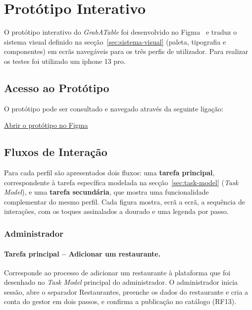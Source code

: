 \chapter{Protótipo Interativo}

O protótipo interativo do \textit{GrabATable} foi desenvolvido no Figma~\cite{figma} e traduz o sistema visual definido na secção~\ref{sec:sistema-visual} (paleta, tipografia e componentes) em ecrãs navegáveis para os três perfis de utilizador. Para realizar os testes foi utilizado um iphone 13 pro.

\section{Acesso ao Protótipo}

O protótipo pode ser consultado e navegado através da seguinte ligação:

\begin{center}
  \href{https://www.figma.com/design/aaighKLXiie4lkBFsrhHsu/GrabATable?m=auto&t=5WWq2U1SLjYclMoF-1}{Abrir o protótipo no Figma}
\end{center}


\section{Fluxos de Interação}

Para cada perfil são apresentados dois fluxos: uma \textbf{tarefa principal},
correspondente à tarefa específica modelada na secção~\ref{sec:task-model} (\textit{Task Model}), e uma
\textbf{tarefa secundária}, que mostra uma funcionalidade complementar do mesmo perfil.
Cada figura mostra, ecrã a ecrã, a sequência de interações, com os toques assinalados a
dourado e uma legenda por passo.

\subsection{Administrador}

\subsubsection{Tarefa principal -- Adicionar um restaurante.}
Corresponde ao processo de adicionar um restaurante à plataforma que foi desenhado no \textit{Task Model} principal do administrador. O administrador inicia sessão, abre o separador Restaurantes, preenche os dados do restaurante e cria a conta do gestor em dois passos, e confirma a publicação no catálogo (RF13).

